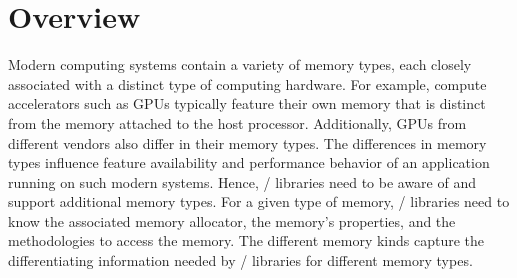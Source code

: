\renewcommand{\Color}[1]{}

\newenvironment{etabular}
  {\edtable{tabular}}
  {\endedtable}

\newcommand{\semanticstwo}[2]
{
\Color{green}
\begin{etabular}{l|l}
\hspace*{0.1cm} & #1 \\
& #2\\
\end{etabular}
\vspace*{0.2cm}
\Color{black}
}

\newcommand{\semanticsthree}[3]
{
\Color{green}
\begin{etabular}{l|l}
\hspace*{0.1cm} & #1 \\
& #2\\
& #3\\
\end{etabular}
\vspace*{0.2cm}
\Color{black}
}

\newcommand{\semanticsfour}[4]
{
\Color{green}
\begin{etabular}{l|l}
\hspace*{0.1cm} & #1 \\
& #2\\
& #3\\
& #4\\
\end{etabular}
\vspace*{0.2cm}
\Color{black}
}

\chapter{Overview}
\label{chap:overview}

Modern computing systems contain a variety of memory types, each
closely associated with a distinct type of computing hardware. For
example, compute accelerators such as GPUs typically feature their
own memory that is distinct from the memory attached to the host
processor. Additionally, GPUs from different vendors also differ
in their memory types. The differences in memory types influence
feature availability and performance behavior of an application
running on such modern systems. Hence, \mpi/ libraries need to be
aware of and support additional memory types. For a given type of
memory, \mpi/ libraries need to know the associated memory allocator,
the memory's properties, and the methodologies to access the memory.
The different memory kinds capture
the differentiating information needed by \mpi/ libraries for different
memory types.

